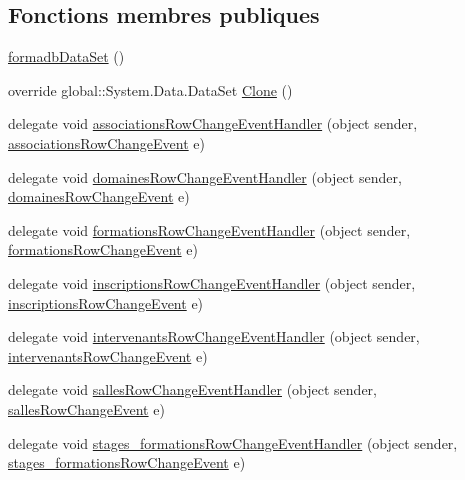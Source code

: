 \subsection*{Fonctions membres publiques}
\begin{DoxyCompactItemize}
\item 
\hyperlink{classforma_1_1formadb_data_set_a38d003b76bed7a523bb9f6c338fb67ee}{formadb\+Data\+Set} ()
\item 
override global\+::\+System.\+Data.\+Data\+Set \hyperlink{classforma_1_1formadb_data_set_a5758eed4234b64428946d323d4197a92}{Clone} ()
\item 
delegate void \hyperlink{classforma_1_1formadb_data_set_aab4b0f2eede2713421e7fb19cd2e5674}{associations\+Row\+Change\+Event\+Handler} (object sender, \hyperlink{classforma_1_1formadb_data_set_1_1associations_row_change_event}{associations\+Row\+Change\+Event} e)
\item 
delegate void \hyperlink{classforma_1_1formadb_data_set_a57fda2e5f9b16b843a20609c32ce5aa9}{domaines\+Row\+Change\+Event\+Handler} (object sender, \hyperlink{classforma_1_1formadb_data_set_1_1domaines_row_change_event}{domaines\+Row\+Change\+Event} e)
\item 
delegate void \hyperlink{classforma_1_1formadb_data_set_a5533167983db2bdb080cf9b8ea065fae}{formations\+Row\+Change\+Event\+Handler} (object sender, \hyperlink{classforma_1_1formadb_data_set_1_1formations_row_change_event}{formations\+Row\+Change\+Event} e)
\item 
delegate void \hyperlink{classforma_1_1formadb_data_set_ad467b14ecca7a1716cfeebbf3b225e71}{inscriptions\+Row\+Change\+Event\+Handler} (object sender, \hyperlink{classforma_1_1formadb_data_set_1_1inscriptions_row_change_event}{inscriptions\+Row\+Change\+Event} e)
\item 
delegate void \hyperlink{classforma_1_1formadb_data_set_a647c81ef89a0024945d837ecab3d1d6f}{intervenants\+Row\+Change\+Event\+Handler} (object sender, \hyperlink{classforma_1_1formadb_data_set_1_1intervenants_row_change_event}{intervenants\+Row\+Change\+Event} e)
\item 
delegate void \hyperlink{classforma_1_1formadb_data_set_ab8ba381b2a9b8c32392a3583b93910fd}{salles\+Row\+Change\+Event\+Handler} (object sender, \hyperlink{classforma_1_1formadb_data_set_1_1salles_row_change_event}{salles\+Row\+Change\+Event} e)
\item 
delegate void \hyperlink{classforma_1_1formadb_data_set_ae1046a5f2fc242610e2e7e5225c4b780}{stages\+\_\+formations\+Row\+Change\+Event\+Handler} (object sender, \hyperlink{classforma_1_1formadb_data_set_1_1stages__formations_row_change_event}{stages\+\_\+formations\+Row\+Change\+Event} e)

\end{DoxyCompactItemize}
